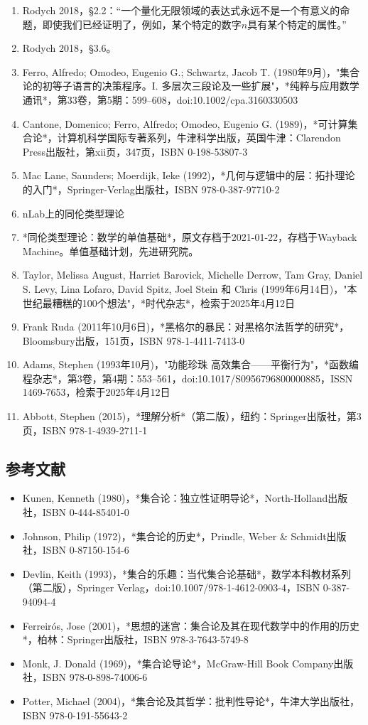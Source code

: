 \begin{enumerate}
\item Rodych 2018，§2.2：“一个量化无限领域的表达式永远不是一个有意义的命题，即使我们已经证明了，例如，某个特定的数字$n$具有某个特定的属性。”  
\item Rodych 2018，§3.6。  
\item Ferro, Alfredo; Omodeo, Eugenio G.; Schwartz, Jacob T. (1980年9月)，"集合论的初等子语言的决策程序。I. 多层次三段论及一些扩展"，*纯粹与应用数学通讯*，第33卷，第5期：599–608，doi:10.1002/cpa.3160330503
\item Cantone, Domenico; Ferro, Alfredo; Omodeo, Eugenio G. (1989)，*可计算集合论*，计算机科学国际专著系列，牛津科学出版，英国牛津：Clarendon Press出版社，第xii页，347页，ISBN 0-198-53807-3  
\item Mac Lane, Saunders; Moerdijk, Ieke (1992)，*几何与逻辑中的层：拓扑理论的入门*，Springer-Verlag出版社，ISBN 978-0-387-97710-2  
\item nLab上的同伦类型理论
\item *同伦类型理论：数学的单值基础*，原文存档于2021-01-22，存档于Wayback Machine。单值基础计划，先进研究院。
\item Taylor, Melissa August, Harriet Barovick, Michelle Derrow, Tam Gray, Daniel S. Levy, Lina Lofaro, David Spitz, Joel Stein 和 Chris (1999年6月14日)，"本世纪最糟糕的100个想法"，*时代杂志*，检索于2025年4月12日
\item Frank Ruda (2011年10月6日)，*黑格尔的暴民：对黑格尔法哲学的研究*，Bloomsbury出版，151页，ISBN 978-1-4411-7413-0
\item Adams, Stephen (1993年10月)，"功能珍珠 高效集合——平衡行为"，*函数编程杂志*，第3卷，第4期：553–561，doi:10.1017/S0956796800000885，ISSN 1469-7653，检索于2025年4月12日  
\item Abbott, Stephen (2015)，*理解分析*（第二版），纽约：Springer出版社，第3页，ISBN 978-1-4939-2711-1
\end{enumerate}
\subsection{参考文献}
\begin{itemize}
\item Kunen, Kenneth (1980)，*集合论：独立性证明导论*，North-Holland出版社，ISBN 0-444-85401-0
\item Johnson, Philip (1972)，*集合论的历史*，Prindle, Weber & Schmidt出版社，ISBN 0-87150-154-6
\item Devlin, Keith (1993)，*集合的乐趣：当代集合论基础*，数学本科教材系列（第二版），Springer Verlag，doi:10.1007/978-1-4612-0903-4，ISBN 0-387-94094-4
\item Ferreirós, Jose (2001)，*思想的迷宫：集合论及其在现代数学中的作用的历史*，柏林：Springer出版社，ISBN 978-3-7643-5749-8
\item Monk, J. Donald (1969)，*集合论导论*，McGraw-Hill Book Company出版社，ISBN 978-0-898-74006-6
\item Potter, Michael (2004)，*集合论及其哲学：批判性导论*，牛津大学出版社，ISBN 978-0-191-55643-2

\end{itemize}